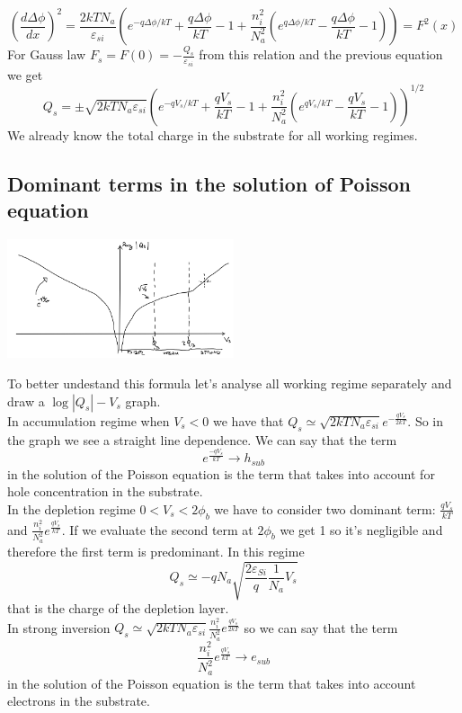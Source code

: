 \begin{equation}
(\frac{d\Delta \phi }{dx})^2=\frac{2kTN_a}{\varepsilon_{si}}\left(e^{-q\Delta \phi/kT}+\frac{q\Delta \phi}{kT}-1+\frac{n_i^2}{N_a^2}(e^{q\Delta \phi/kT}-\frac{q\Delta \phi}{kT}-1)\right)=F^2(x)
\end{equation}
For Gauss law $F_s=F(0)=-\frac{Q_s}{\varepsilon_{si}}$ from this relation and the previous equation we get
\begin{equation}
Q_s=\pm\sqrt{2kTN_a\varepsilon_{si}}\left(e^{-qV_s/kT}+\frac{qV_s}{kT}-1+\frac{n_i^2}{N_a^2}(e^{qV_s/kT}-\frac{qV_s}{kT}-1)\right)^{1/2}
\end{equation}
We already know the total charge in the substrate for all working regimes.\\

\subsection{Dominant terms in the solution of Poisson equation}

\centering
\includegraphics[width=0.5\textwidth]{logqVs.png}\\
\raggedright

To better undestand this formula let's analyse all working regime separately and draw a $\log |Q_s| - V_s$ graph.\\

\tab \tab In accumulation regime when $V_s<0$ we have that $Q_s\simeq \sqrt{2kTN_a\varepsilon_{si}}e^{-\frac{qV_s}{2kT}}$. So in the graph we see a straight line dependence. We can say that the term
\begin{equation}
e^{\frac{-qV_s}{kT}}\rightarrow h_{sub}
\end{equation} 
in the solution of the Poisson equation is the term that takes into account for hole concentration in the substrate.\\
\tab \tab In the depletion regime $0<V_s<2\phi_b$ we have to consider two dominant term: $\frac{qV_s}{kT}$ and $\frac{n_i^2}{N_a^2}e^{\frac{qV_s}{kT}}$. If we evaluate the second term at $2\phi_b$ we get 1 so it's negligible and therefore the first term is predominant. In this regime
\begin{equation}
Q_s\simeq -qN_a\sqrt{\frac{2\varepsilon_{Si}}{q}\frac{1}{N_a}V_s}
\end{equation}
that is the charge of the depletion layer.\\
\tab \tab In strong inversion $Q_s\simeq \sqrt{2kTN_a\varepsilon_{si}}\frac{n_i^2}{N_a^2}e^{\frac{qV_s}{2kT}}$ so we can say that the term
\begin{equation}
\frac{n_i^2}{N_a^2}e^{\frac{qV_s}{kT}}\rightarrow e_{sub}
\end{equation}
in the solution of the Poisson equation is the term that takes into account electrons in the substrate.\\

